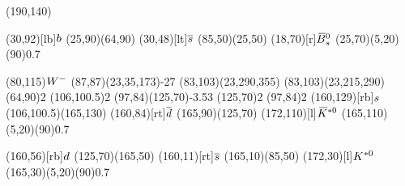 \documentclass{standalone}
\begin{document}
\begin{axopicture}(190,140)

  \Text(30,92)[lb]{${b}$}                     %
  \Line[arrow](25,90)(64,90)                      %
  \Text(30,48)[lt]{${\overline {{s}}}$}                  %
  \Line[arrow](85,50)(25,50)                      %
  \Text(18,70)[r]{${{\kern 0.18em\overline{\kern -0.18em B}}{}^0_{s}}$}                         %
  \GOval(25,70)(5,20)(90){0.7}                    %
                                                  
  \Text(80,115){\small{${W^-}$}}                    %
  \PhotonArc(87,87)(23,35,173){-2}{7}             %
  \Arc[arrow,arrowpos=0.60](83,103)(23,290,355)   %
  \Arc[arrow,arrowpos=0.60](83,103)(23,215,290)   %
  \Vertex(64,90){2}                               %
  \Vertex(106,100.5){2}                           %
  \Gluon(97,84)(125,70){-3.5}{3}                  %
  \Vertex(125,70){2}                              %
  \Vertex(97,84){2}                               %
  \Text(160,129)[rb]{${s}$}                   %
  \Line[arrow](106,100.5)(165,130)                %
  \Text(160,84)[rt]{${\overline {{d}}}$}                 %
  \Line[arrow](165,90)(125,70)                    %
  \Text(172,110)[l]{${{\kern 0.18em\overline{\kern -0.18em K}}{}^{*0}}$}                   %
  \GOval(165,110)(5,20)(90){0.7}                  %
                                                  
  \Text(160,56)[rb]{${d}$}                    %
  \Line[arrow](125,70)(165,50)                    %
  \Text(160,11)[rt]{${\overline {{s}}}$}                 %
  \Line[arrow](165,10)(85,50)                     %
  \Text(172,30)[l]{${{K}^{*0}}$}                     %
  \GOval(165,30)(5,20)(90){0.7}                   %
                                                  
\end{axopicture}
\end{document}
